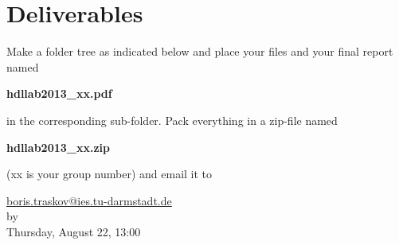 \newpage
\section{Deliverables}
Make a folder tree as indicated below and place your files and your final report named 
\begin{center}
\textbf{hdllab2013\_xx.pdf}
\end{center}
 in the corresponding sub-folder. Pack everything in a zip-file named 
\begin{center}\textbf{hdllab2013\_xx.zip}
\end{center}
 (xx is your group number) and email it to 
\begin{center}
\href{mailto:boris.traskov@ies.tu-darmstadt.de}{boris.traskov@ies.tu-darmstadt.de}\\
by\\
Thursday, August 22, 13:00
\end{center}


